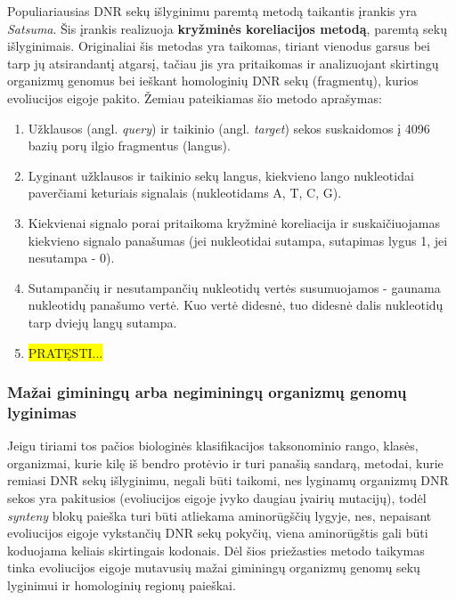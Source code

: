 \documentclass[12pt]{article}
\begin{document}
Populiariausias DNR sekų išlyginimu paremtą metodą taikantis įrankis yra
\emph{Satsuma}\cite{SATSUMA}. Šis įrankis realizuoja \textbf{kryžminės
koreliacijos metodą}, paremtą sekų išlyginimais. Originaliai šis metodas yra
taikomas, tiriant vienodus garsus bei tarp jų atsirandantį atgarsį, tačiau jis
yra pritaikomas ir analizuojant skirtingų organizmų genomus bei ieškant
homologinių DNR sekų (fragmentų), kurios evoliucijos eigoje pakito. Žemiau
pateikiamas šio metodo aprašymas:
\begin{enumerate}
    \item Užklausos (angl. \emph{query}) ir taikinio (angl. \emph{target})
    sekos suskaidomos į 4096 bazių porų ilgio fragmentus (langus).

    \item Lyginant užklausos ir taikinio sekų langus, kiekvieno lango
    nukleotidai paverčiami keturiais signalais (nukleotidams A, T, C, G).

    \item Kiekvienai signalo porai pritaikoma kryžminė koreliacija ir
    suskaičiuojamas kiekvieno signalo panašumas (jei nukleotidai sutampa,
    sutapimas lygus 1, jei nesutampa - 0).
    
    \item Sutampančių ir nesutampančių nukleotidų vertės susumuojamos -
    gaunama nukleotidų panašumo vertė. Kuo vertė didesnė, tuo didesnė
    dalis nukleotidų tarp dviejų langų sutampa.

    \item \colorbox{yellow}{PRATĘSTI...}

\end{enumerate}

\subsubsection{Mažai giminingų arba negiminingų organizmų genomų lyginimas}
Jeigu tiriami tos pačios biologinės klasifikacijos taksonominio rango, klasės,
organizmai, kurie kilę iš bendro protėvio ir turi panašią sandarą, metodai,
kurie remiasi DNR sekų išlyginimu, negali būti taikomi, nes lyginamų organizmų
DNR sekos yra pakitusios (evoliucijos eigoje įvyko daugiau įvairių mutacijų),
todėl \emph{synteny} blokų paieška turi būti atliekama aminorūgščių lygyje,
nes, nepaisant evoliucijos eigoje vykstančių DNR sekų pokyčių, viena
aminorūgštis gali būti koduojama keliais skirtingais kodonais. Dėl šios
priežasties metodo taikymas tinka evoliucijos eigoje mutavusių mažai giminingų
organizmų genomų sekų lyginimui ir homologinių regionų paieškai.
\end{document}

